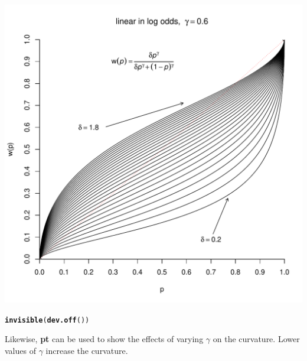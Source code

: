\documentclass{article}\usepackage[]{graphicx}\usepackage[]{color}
\makeatletter
\def\maxwidth{ %
  \ifdim\Gin@nat@width>\linewidth
    \linewidth
  \else
    \Gin@nat@width
  \fi
}
\newcommand{\hlstd}[1]{\textcolor[rgb]{0.345,0.345,0.345}{#1}}%
\newcommand{\hlkwd}[1]{\textcolor[rgb]{0.737,0.353,0.396}{\textbf{#1}}}%
\newenvironment{kframe}{%
 \def\at@end@of@kframe{}%
 \ifinner\ifhmode%
  \def\at@end@of@kframe{\end{minipage}}%
  \begin{minipage}{\columnwidth}%
 \fi\fi%
 \def\FrameCommand##1{\hskip\@totalleftmargin \hskip-\fboxsep
 \colorbox{shadecolor}{##1}\hskip-\fboxsep
     \hskip-\linewidth \hskip-\@totalleftmargin \hskip\columnwidth}%
 \MakeFramed {\advance\hsize-\width
   \@totalleftmargin\z@ \linewidth\hsize
   \@setminipage}}%
 {\par\unskip\endMakeFramed%
 \at@end@of@kframe}
\newenvironment{knitrout}{}{} %
\makeatother
\begin{document}
\begin{knitrout}
{\centering \includegraphics[width=\maxwidth]{figure/unnamed-chunk-21} 

}


\begin{kframe}\begin{alltt}
\hlkwd{invisible}\hlstd{(}\hlkwd{dev.off}\hlstd{())}
\end{alltt}
\end{kframe}
\end{knitrout}


Likewise, {\bf pt} can be used to show the effects of varying $\gamma$ on the curvature. Lower values of $\gamma$ increase the curvature.
\end{document}

